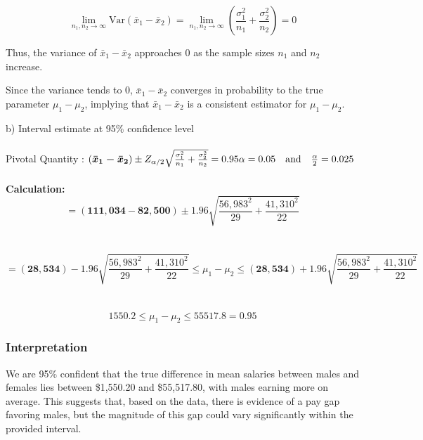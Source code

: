 \documentclass[12pt,a4paper]{article}
\begin{document}
\[
\lim_{n_1, n_2 \to \infty} \text{Var}(\bar{x}_1 - \bar{x}_2) = \lim_{n_1, n_2 \to \infty} \left( \frac{\sigma_1^2}{n_1} + \frac{\sigma_2^2}{n_2} \right) = 0
\]

Thus, the variance of \(\bar{x}_1 - \bar{x}_2\) approaches 0 as the sample sizes \(n_1\) and \(n_2\) increase.

Since the variance tends to 0, \(\bar{x}_1 - \bar{x}_2\) converges in probability to the true parameter \(\mu_1 - \mu_2\), implying that \(\bar{x}_1 - \bar{x}_2\) is a consistent estimator for \(\mu_1 - \mu_2\).


\vspace{0.5cm}
\hline
\vspace{0.5cm}
b) Interval estimate at 95\% confidence level \\\\
Pivotal Quantity : $(\boldsymbol{\bar{x}_1 - \bar{x}_2})  \pm Z_{\alpha/2} \sqrt{\frac{\sigma_1^2}{n_1} + \frac{\sigma_2^2}{n_2}} = 0.95 \\ \alpha = 0.05 \quad \text{and} \quad \frac{\alpha}{2} = 0.025$ \\\\

\vspace{0.5cm}
\textbf{Calculation:} \\
\[
\boldsymbol{ = (111,034-82,500)} \pm 1.96 \sqrt{\frac{56,983^2}{29} + \frac{41,310^2}{22}}
\]
\\\\
\[= 
\boldsymbol{ (28,534)} - 1.96 \sqrt{\frac{56,983^2}{29} + \frac{41,310^2}{22}} \leq \mu_1 - \mu_2 \leq \boldsymbol{(28,534)} + 1.96 \sqrt{\frac{56,983^2}{29} + \frac{41,310^2}{22}}
\]
\\\\
\[  1550.2 \leq  \mu_1 - \mu_2 \leq 55517.8= 0.95 \]

\subsubsection*{Interpretation}
 
We are 95\% confident that the true difference in mean salaries between males and females lies between \$1,550.20 and \$55,517.80, with males earning more on average. This suggests that, based on the data, there is evidence of a pay gap favoring males, but the magnitude of this gap could vary significantly within the provided interval.
\\\\
\newpage
\end{document}
